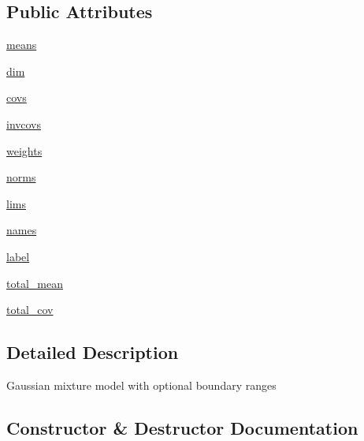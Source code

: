 \subsection*{Public Attributes}
\begin{DoxyCompactItemize}
\item 
\mbox{\hyperlink{classgetdist_1_1gaussian__mixtures_1_1MixtureND_aeee57b3c06a515c91821b09866b52da3}{means}}
\item 
\mbox{\hyperlink{classgetdist_1_1gaussian__mixtures_1_1MixtureND_aa0e4eeb32e8dc0e04a93a0f3431fb7cb}{dim}}
\item 
\mbox{\hyperlink{classgetdist_1_1gaussian__mixtures_1_1MixtureND_a51e91169ecb626b2ca59779abeed17b7}{covs}}
\item 
\mbox{\hyperlink{classgetdist_1_1gaussian__mixtures_1_1MixtureND_a89c70bf492cb60389a60573edecb1363}{invcovs}}
\item 
\mbox{\hyperlink{classgetdist_1_1gaussian__mixtures_1_1MixtureND_a7fbae73d771ec0e1ca1f80558ad3b08b}{weights}}
\item 
\mbox{\hyperlink{classgetdist_1_1gaussian__mixtures_1_1MixtureND_a4998c276678ccda9d6ae0f6479f2dd89}{norms}}
\item 
\mbox{\hyperlink{classgetdist_1_1gaussian__mixtures_1_1MixtureND_a0b9e4c4e0b3529e79cfa980507f8d2ea}{lims}}
\item 
\mbox{\hyperlink{classgetdist_1_1gaussian__mixtures_1_1MixtureND_ad26124d47b68d38fa8e90bc135769e6b}{names}}
\item 
\mbox{\hyperlink{classgetdist_1_1gaussian__mixtures_1_1MixtureND_aa9a7187396fe46246dc62e921c17302c}{label}}
\item 
\mbox{\hyperlink{classgetdist_1_1gaussian__mixtures_1_1MixtureND_a09c9c27ba69f685df1ac90bbcbb37436}{total\+\_\+mean}}
\item 
\mbox{\hyperlink{classgetdist_1_1gaussian__mixtures_1_1MixtureND_ad0e99b9b612a899813c98c8a5cafe646}{total\+\_\+cov}}
\end{DoxyCompactItemize}


\subsection{Detailed Description}
\begin{DoxyVerb}Gaussian mixture model with optional boundary ranges
\end{DoxyVerb}
 

\subsection{Constructor \& Destructor Documentation}
\mbox{\label{classgetdist_1_1gaussian__mixtures_1_1MixtureND_ae08d46f0f7923a7dcb43eb540c8b9de6}} 

